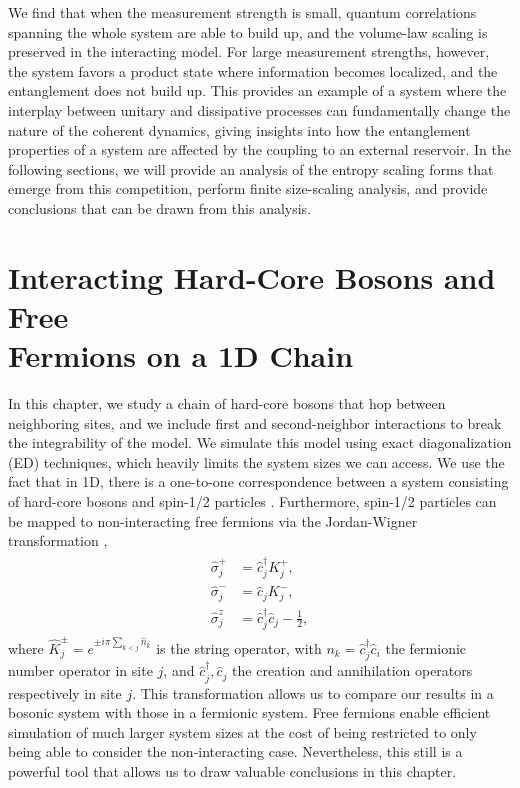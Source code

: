We find that when the measurement strength is small, quantum correlations spanning the whole system are able to build up, and the volume-law scaling is preserved in the interacting model. For large measurement strengths, however, the system favors a product state where information becomes localized, and the entanglement does not build up. This provides an example of a system where the interplay between unitary and dissipative processes can fundamentally change the nature of the coherent dynamics, giving insights into how the entanglement properties of a system are affected by the coupling to an external reservoir. In the following sections, we will provide an analysis of the entropy scaling forms that emerge from this competition, perform finite size-scaling analysis, and provide conclusions that can be drawn from this analysis.

\section[Interacting Hard-Core Bosons and Free Fermions on a 1D Chain]{Interacting Hard-Core Bosons and Free \\ Fermions on a 1D Chain}

In this chapter, we study a chain of hard-core bosons that hop between neighboring sites, and we include first and second-neighbor interactions to break the integrability of the model. We simulate this model using exact diagonalization (ED) techniques, which heavily limits the system sizes we can access. We use the fact that in 1D, there is a one-to-one correspondence between a system consisting of hard-core bosons and spin-1/2 particles \cite{halperin1986}. Furthermore, spin-1/2 particles can be mapped to non-interacting free fermions via the Jordan-Wigner transformation \cite{nielsen}, 
\begin{align}
\begin{split}    
    \hat{\sigma}_j^+ &= \hat{c}_j^\dagger K_j^+, \\
    \hat{\sigma}_j^- &= \hat{c}_j K_j^-, \\
    \hat{\sigma}_j^z &= \hat{c}_j^\dagger \hat{c}_j - \frac{1}{2},
\end{split}
\end{align}
where $\hat{K}_j^{\pm} = e^{\pm i \pi \sum_{k<j} \hat{n}_k}$ is the string operator, with $n_k = \hat{c}_j^\dagger \hat{c}_i$ the fermionic number operator in site $j$, and $\hat{c}_j^\dagger, \hat{c}_j$ the creation and annihilation operators respectively in site $j$.
This transformation allows us to compare our results in a bosonic system with those in a fermionic system. Free fermions enable efficient simulation of much larger system sizes at the cost of being restricted to only being able to consider the non-interacting case. Nevertheless, this still is a powerful tool that allows us to draw valuable conclusions in this chapter.

